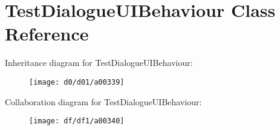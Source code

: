 \hypertarget{a00145}{\section{Test\-Dialogue\-U\-I\-Behaviour Class Reference}
\label{a00145}
}


Inheritance diagram for Test\-Dialogue\-U\-I\-Behaviour\-:
\nopagebreak
\begin{figure}[H]
\begin{center}
\leavevmode
\texttt{[image: d0/d01/a00339]}
\end{center}
\end{figure}


Collaboration diagram for Test\-Dialogue\-U\-I\-Behaviour\-:
\nopagebreak
\begin{figure}[H]
\begin{center}
\leavevmode
\texttt{[image: df/df1/a00340]}
\end{center}
\end{figure}

